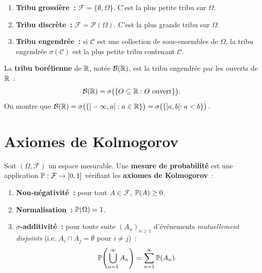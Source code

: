 \begin{exemple}
\begin{enumerate}
    \item \textbf{Tribu grossi\`ere~:} $\mathcal{F} = \{\emptyset, \Omega\}$.
          C'est la plus petite tribu sur $\Omega$.
    \item \textbf{Tribu discr\`ete~:} $\mathcal{F} = \mathcal{P}(\Omega)$.
          C'est la plus grande tribu sur $\Omega$.
    \item \textbf{Tribu engendr\'ee~:} si $\mathcal{C}$ est une collection de
          sous-ensembles de $\Omega$, la tribu engendr\'ee $\sigma(\mathcal{C})$
          est la plus petite tribu contenant $\mathcal{C}$.
\end{enumerate}
\end{exemple}

\begin{definition}
La \textbf{tribu bor\'elienne} de $\mathbb{R}$, not\'ee $\mathcal{B}(\mathbb{R})$, est la tribu
engendr\'ee par les ouverts de $\mathbb{R}$~:
\[
    \mathcal{B}(\mathbb{R}) = \sigma\bigl(\{O \subseteq \mathbb{R} : O \text{ ouvert}\}\bigr).
\]
On montre que $\mathcal{B}(\mathbb{R}) = \sigma\bigl(\{]-\infty, a] : a \in \mathbb{R}\}\bigr)
= \sigma\bigl(\{]a, b[ : a < b\}\bigr)$.
\end{definition}

\section{Axiomes de Kolmogorov}

\begin{definition}
\label{def:proba}
Soit $(\Omega, \mathcal{F})$ un espace mesurable. Une \textbf{mesure de probabilit\'e}
est une application $\mathbb{P} : \mathcal{F} \to [0,1]$ v\'erifiant les
\textbf{axiomes de Kolmogorov}~:
\begin{enumerate}[label=\bfseries (K\arabic*)]
    \item \textbf{Non-n\'egativit\'e~:} pour tout $A \in \mathcal{F}$,
          $\mathbb{P}(A) \geq 0$.
    \item \textbf{Normalisation~:} $\mathbb{P}(\Omega) = 1$.
    \item \textbf{$\sigma$-additivit\'e~:} pour toute suite $(A_n)_{n \geq 1}$
          d'\'ev\'enements \emph{mutuellement disjoints} (i.e. $A_i \cap A_j = \emptyset$
          pour $i \neq j$)~:
          \[
              \mathbb{P}\!\left(\bigcup_{n=1}^{\infty} A_n\right)
              = \sum_{n=1}^{\infty} \mathbb{P}(A_n).
          \]
\end{enumerate}
\end{definition}


